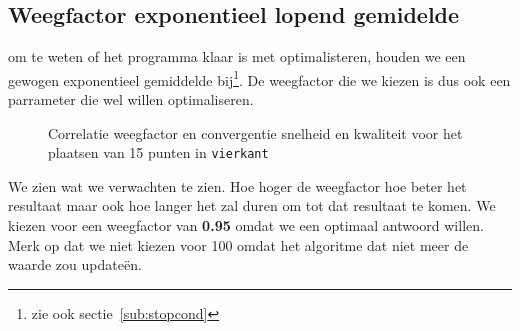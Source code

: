 \subsection{Weegfactor exponentieel lopend gemidelde}
om te weten of het programma klaar is met optimalisteren, houden we een gewogen exponentieel gemiddelde bij\footnote{zie ook sectie~\ref{sub:stopcond}}. De weegfactor die we kiezen is dus ook een parrameter die wel willen optimaliseren.
\begin{figure}[H]
\caption{Correlatie weegfactor en convergentie snelheid en kwaliteit voor het plaatsen van 15 punten in \texttt{vierkant}}
\label{graf:weightingFactor}
\end{figure}
We zien wat we verwachten te zien. Hoe hoger de weegfactor hoe beter het resultaat maar ook hoe langer het zal duren om tot dat resultaat te komen. 
We kiezen voor een weegfactor van \textbf{0.95} omdat we een optimaal antwoord willen. Merk op dat we niet kiezen voor 100 omdat het algoritme dat niet meer de waarde zou updateën. 

%
